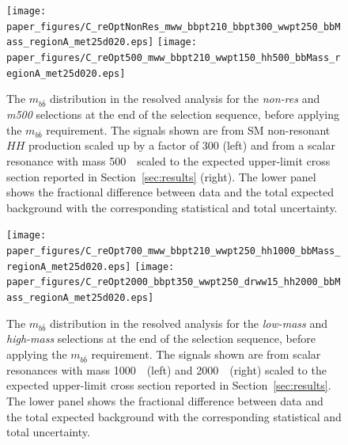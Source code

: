 \begin{figure}
\begin{flushleft}
\texttt{[image: paper\_figures/C\_reOptNonRes\_mww\_bbpt210\_bbpt300\_wwpt250\_bbMass\_regionA\_met25d020.eps]}
\texttt{[image: paper\_figures/C\_reOpt500\_mww\_bbpt210\_wwpt150\_hh500\_bbMass\_regionA\_met25d020.eps]}
\end{flushleft}
\caption[The $m_{b \bar{b}}$ distribution]{The $m_{b \bar{b}}$ distribution in the resolved analysis for the \emph{non-res} and \emph{m500} selections at the end of the
 selection sequence, before applying the $m_{b \bar{b}}$ requirement. The signals shown
 are from SM non-resonant $HH$ production scaled up by a factor of 300 (left) and from a scalar resonance with mass 500~\GeV\ scaled to the expected upper-limit
 cross section reported in Section~\ref{sec:results} (right).  The lower panel shows the fractional difference
  between data and the total expected background
 with the corresponding statistical and total uncertainty.
} \label{fig:mbb_1}
\end{figure}
 
\begin{figure}
\begin{flushleft}
\texttt{[image: paper\_figures/C\_reOpt700\_mww\_bbpt210\_wwpt250\_hh1000\_bbMass\_regionA\_met25d020.eps]}
\texttt{[image: paper\_figures/C\_reOpt2000\_bbpt350\_wwpt250\_drww15\_hh2000\_bbMass\_regionA\_met25d020.eps]}
\end{flushleft}
\caption[The $m_{b \bar{b}}$ distribution]{The $m_{b \bar{b}}$ distribution in the resolved analysis for the
 \emph{low-mass} and \emph{high-mass} selections at the end of the
 selection sequence, before applying the $m_{b \bar{b}}$ requirement. The signals shown
 are from scalar resonances with mass 1000~\GeV\ (left) and 2000~\GeV\ (right)
 scaled to the expected upper-limit cross section reported in
 Section~\ref{sec:results}.  The lower panel shows the fractional difference
  between data and the total expected background
 with the corresponding statistical and total uncertainty.} \label{fig:mbb_2}
\end{figure}
 
 
